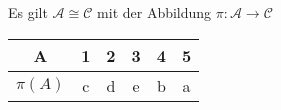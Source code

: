 \documentclass[a4paper,10pt]{article}
\begin{document}
\begin{compactenum} [(a)]
\begin{compactitem}
\begin{compactitem}
			\end{compactitem}
			\item Es gilt $ \mathcal{A} \cong \mathcal{C}$ mit der Abbildung $ \pi : \mathcal{A} \rightarrow \mathcal{C} $\\
			\begin{tabular} {c|c|c|c|c|c}
				A & 1 & 2 & 3 & 4 & 5 \\ \hline
				$ \pi(A) $ & c & d & e & b & a
			\end{tabular}
		\end{compactitem}
	\end{compactenum}
		
\end{document}
